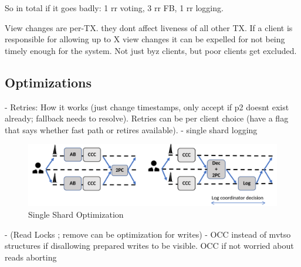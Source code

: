


So in total if it goes badly: 1 rr voting, 3 rr FB, 1 rr logging.


View changes are per-TX. they dont affect liveness of all other TX. If a client is responsible for allowing up to X view changes it can be expelled for not being timely enough for the system.
Not just byz clients, but poor clients get excluded.
\subsection{Optimizations}
- Retries: How it works (just change timestamps, only accept if p2 doesnt exist already; fallback needs to resolve). Retries can be per client choice (have a flag that says whether fast path or retires available).
- single shard logging
\begin{figure}
\begin{center}
\includegraphics[width= \textwidth]{./figures/SingleShard.png}
\end{center}
\caption{Single Shard Optimization}
\label{fig:Figure1}
\end{figure}


- (Read Locks ; remove can be optimization for writes)
- OCC instead of mvtso structures if disallowing prepared writes to be visible. OCC if not worried about reads aborting

